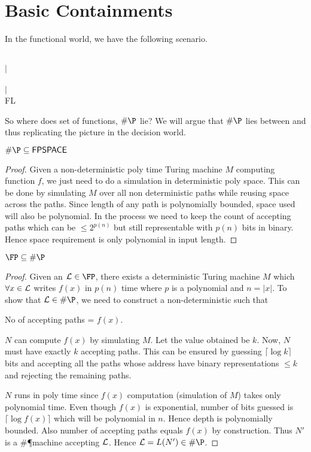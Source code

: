 \section{Basic Containments}
In the functional world, we have the following scenario.
\begin{center}
\FPSPACE \\
$\vert$ \\
\FP \\
$\vert$ \\
{\sf FL }
\end{center}

So where does set of functions, $\#\P$ lie? We will argue that $\#\P$ lies between 
\FP and \FPSPACE thus replicating the picture in the decision world.
\begin{lemma}
$\#\P \subseteq \FPSPACE$
\end{lemma}
\begin{proof}
Given a non-deterministic poly time Turing machine $M$ computing function $f$,
we just need to do a simulation in deterministic poly space. This can be done by
simulating $M$ over all non deterministic paths while reusing space across the
paths. Since length of any path is polynomially bounded, space used will also
be polynomial. In the process we need to keep the count of accepting paths
which can be $\le 2^{p(n)}$ but still representable with $p(n)$ bits in
binary. Hence space requirement is only polynomial in input length.
\end{proof}

\begin{lemma}
$\FP \subseteq \#\P$
\end{lemma}
\begin{proof}
Given an $\calL \in \FP$, there exists a deterministic Turing machine $M$ which
$\forall x \in {\cal L}$ writes $f(x)$ in $p(n)$ time where $p$ is a polynomial
and $n = |x|$. To show that $\calL \in \#\P$, we need to construct a
non-deterministic  such that
\begin{center}
No of accepting paths = $f(x)$.
\end{center}
$N$ can compute $f(x)$ by simulating $M$. Let the value obtained be $k$. Now,
$N$ must have exactly $k$ accepting paths. This can be ensured by guessing
$\lceil \log k \rceil$ bits and accepting all the paths whose address have
binary representations  $\le k$ and rejecting the remaining paths.

$N$ runs in poly time since $f(x)$ computation (simulation of $M$) takes only
polynomial time. Even though $f(x)$ is exponential, number of bits guessed is
$\lceil \log f(x) \rceil$ which will be polynomial in $n$. Hence depth is
polynomially bounded. Also number of accepting paths equals $f(x)$ by
construction. Thus $N'$ is a \#\P machine accepting ${\cal L}$. Hence $\calL =
L(N') \in \#\P$.
\end{proof}

